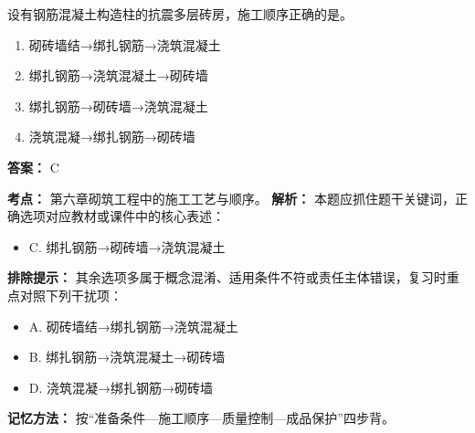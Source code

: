 \documentclass[UTF8,fontset=fandol,11pt]{ctexart}
\begin{document}
\begin{quizbox}[title={第 23 题}]
设有钢筋混凝土构造柱的抗震多层砖房，施工顺序正确的是。\\
\begin{enumerate}[label=\Alph*.]
\item 砌砖墙结→绑扎钢筋→浇筑混凝土
\item 绑扎钢筋→浇筑混凝土→砌砖墙
\item 绑扎钢筋→砌砖墙→浇筑混凝土
\item 浇筑混凝→绑扎钢筋→砌砖墙
\end{enumerate}
\textbf{答案：} C
\vspace{0.25em}
\begin{answerbox}[title={考点解析}]
\textbf{考点：} 第六章砌筑工程中的施工工艺与顺序。
\textbf{解析：} 本题应抓住题干关键词，正确选项对应教材或课件中的核心表述：
\begin{itemize}
\item C. 绑扎钢筋→砌砖墙→浇筑混凝土
\end{itemize}
\textbf{排除提示：} 其余选项多属于概念混淆、适用条件不符或责任主体错误，复习时重点对照下列干扰项：
\begin{itemize}
\item A. 砌砖墙结→绑扎钢筋→浇筑混凝土
\item B. 绑扎钢筋→浇筑混凝土→砌砖墙
\item D. 浇筑混凝→绑扎钢筋→砌砖墙
\end{itemize}
\textbf{记忆方法：} 按“准备条件—施工顺序—质量控制—成品保护”四步背。
\end{answerbox}
\end{quizbox}

\vspace{0.2em}
\end{document}
